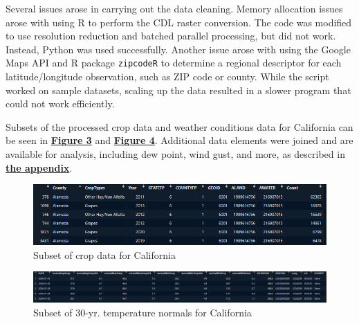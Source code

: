 \documentclass{article}
\begin{document}
Several issues arose in carrying out the data cleaning. Memory allocation issues arose with using R to perform the CDL raster conversion. The code was modified to use resolution reduction and batched parallel processing, but did not work. Instead, Python was used successfully. Another issue arose with using the Google Maps API and R package \texttt{zipcodeR} to determine a regional descriptor for each latitude/longitude observation, such as ZIP code or county. While the script worked on sample datasets, scaling up the data resulted in a slower program that could not work efficiently.

Subsets of the processed crop data and weather conditions data for California can be seen in \textbf{\hyperref[sec:cropsubset]{Figure 3}} and \textbf{\hyperref[sec:weathersubset]{Figure 4}}. Additional data elements were joined and are available for analysis, including dew point, wind gust, and more, as described in \textbf{\hyperref[sec:curated]{the appendix}}. \\

\begin{figure}[H]
\vspace*{-5mm}
\label{sec:cropsubset}
\centering
\includegraphics[width=1.0\textwidth]{Final_Report/images/Crop_Dataset.png}
\vspace*{-5mm}
\caption{Subset of crop data for California}
\end{figure}

\begin{figure}[H]
\vspace*{-5mm}
\label{sec:weathersubset}
\centering
\includegraphics[width=1.0\textwidth]{Final_Report/images/Normals_Dataset.png}
\vspace*{-5mm}
\caption{Subset of 30-yr. temperature normals for California}
\end{figure} 
\end{document}
